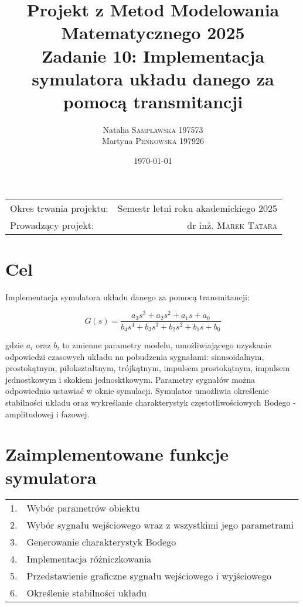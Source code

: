 \documentclass[10pt, a4paper]{article}
\title{
  \textbf{Projekt z Metod Modelowania Matematycznego 2025} \\
  \large Zadanie 10: Implementacja symulatora układu danego za pomocą transmitancji
}
\author{
  Natalia \textsc{Sampławska 197573} \\
  Martyna \textsc{Penkowska 197926}
}
\date{\today}
\begin{document}
\maketitle

\begin{center}
  \begin{tabular}{l r}
    Okres trwania projektu: & Semestr letni roku akademickiego 2025 \\
    Prowadzący projekt: & dr inż. \textsc{Marek Tatara}
  \end{tabular}
\end{center}

\vspace{0.1cm}


\section{Cel}

Implementacja symulatora układu danego za pomocą transmitancji: 

\[
G(s) = \frac{a_3 s^3 + a_2 s^2 + a_1 s + a_0}{b_4 s^4 + b_3 s^3 + b_2 s^2 + b_1 s + b_0}
\]

gdzie \( a_i \) oraz \( b_i \) to zmienne parametry modelu, umożliwiającego uzyskanie odpowiedzi czasowych układu na pobudzenia sygnałami: sinusoidalnym, prostokątnym,
piłokształtnym, trójkątnym, impulsem prostokątnym, impulsem jednostkowym i skokiem jednosktkowym. Parametry sygnałów można odpowiednio ustawiać w oknie symulacji. Symulator 
umożliwia określenie stabilności układu oraz wykreślanie charakterystyk częstotliwościowych Bodego - amplitudowej i fazowej. 


\section{Zaimplementowane funkcje symulatora}

\begin{tabular}{l l}
	1. & Wybór parametrów obiektu\\ 
	2. & Wybór sygnału wejściowego wraz z wszystkimi jego parametrami\\
	3. & Generowanie charakterystyk Bodego\\
	4. & Implementacja różniczkowania\\
	5. & Przedstawienie graficzne sygnału wejściowego i wyjściowego\\
  6. & Określenie stabilności układu \\
\end{tabular}
\end{document}
